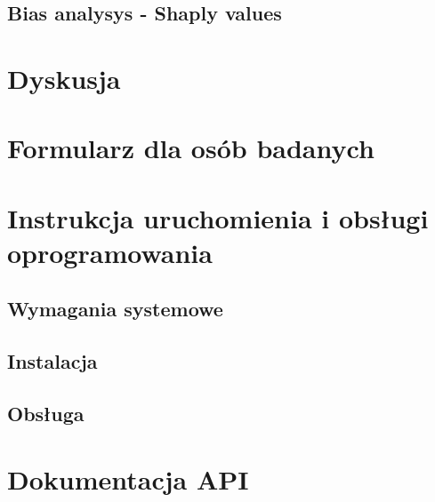 \documentclass{./assets/wfis}
\begin{document}
\section{Bias analysys - Shaply values}\label{bias}

\chapter{Dyskusja}\label{dyskusja}

\appendix
\chapter{Formularz dla osób badanych}
\chapter{Instrukcja uruchomienia i obsługi oprogramowania}
\section{Wymagania systemowe}
\section{Instalacja}
\section{Obsługa}
\chapter{Dokumentacja API}

\printbibliography

\clearpage
\listoffigures
\clearpage
\listoftables
\clearpage
\end{document}
